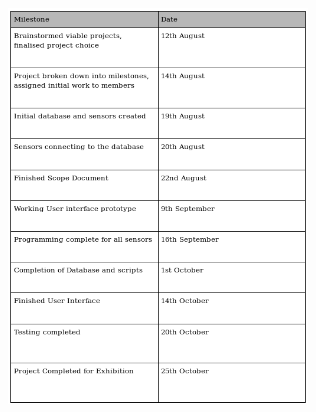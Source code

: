 \documentclass{article}
\begin{document}
        \begin{center}
            \includegraphics[width=300px]{Images/Milestones.jpg}
        \end{center}

        \newpage
\end{document}
